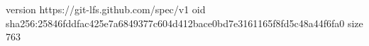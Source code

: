 version https://git-lfs.github.com/spec/v1
oid sha256:25846fddfac425e7a6849377c604d412bace0bd7e3161165f8fd5c48a44f6fa0
size 763
